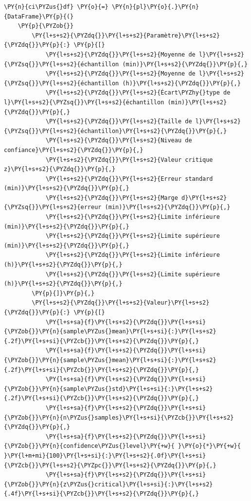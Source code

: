 \begin{tcolorbox}[breakable, size=fbox, boxrule=1pt, pad at break*=1mm,colback=cellbackground, colframe=cellborder]
\begin{Verbatim}[commandchars=\\\{\}]
\PY{n}{ci\PYZus{}df} \PY{o}{=} \PY{n}{pl}\PY{o}{.}\PY{n}{DataFrame}\PY{p}{(}
    \PY{p}{\PYZob{}}
        \PY{l+s+s2}{\PYZdq{}}\PY{l+s+s2}{Paramètre}\PY{l+s+s2}{\PYZdq{}}\PY{p}{:} \PY{p}{[}
            \PY{l+s+s2}{\PYZdq{}}\PY{l+s+s2}{Moyenne de l}\PY{l+s+s2}{\PYZsq{}}\PY{l+s+s2}{échantillon (min)}\PY{l+s+s2}{\PYZdq{}}\PY{p}{,}
            \PY{l+s+s2}{\PYZdq{}}\PY{l+s+s2}{Moyenne de l}\PY{l+s+s2}{\PYZsq{}}\PY{l+s+s2}{échantillon (h)}\PY{l+s+s2}{\PYZdq{}}\PY{p}{,}
            \PY{l+s+s2}{\PYZdq{}}\PY{l+s+s2}{Écart\PYZhy{}type de l}\PY{l+s+s2}{\PYZsq{}}\PY{l+s+s2}{échantillon (min)}\PY{l+s+s2}{\PYZdq{}}\PY{p}{,}
            \PY{l+s+s2}{\PYZdq{}}\PY{l+s+s2}{Taille de l}\PY{l+s+s2}{\PYZsq{}}\PY{l+s+s2}{échantillon}\PY{l+s+s2}{\PYZdq{}}\PY{p}{,}
            \PY{l+s+s2}{\PYZdq{}}\PY{l+s+s2}{Niveau de confiance}\PY{l+s+s2}{\PYZdq{}}\PY{p}{,}
            \PY{l+s+s2}{\PYZdq{}}\PY{l+s+s2}{Valeur critique z}\PY{l+s+s2}{\PYZdq{}}\PY{p}{,}
            \PY{l+s+s2}{\PYZdq{}}\PY{l+s+s2}{Erreur standard (min)}\PY{l+s+s2}{\PYZdq{}}\PY{p}{,}
            \PY{l+s+s2}{\PYZdq{}}\PY{l+s+s2}{Marge d}\PY{l+s+s2}{\PYZsq{}}\PY{l+s+s2}{erreur (min)}\PY{l+s+s2}{\PYZdq{}}\PY{p}{,}
            \PY{l+s+s2}{\PYZdq{}}\PY{l+s+s2}{Limite inférieure (min)}\PY{l+s+s2}{\PYZdq{}}\PY{p}{,}
            \PY{l+s+s2}{\PYZdq{}}\PY{l+s+s2}{Limite supérieure (min)}\PY{l+s+s2}{\PYZdq{}}\PY{p}{,}
            \PY{l+s+s2}{\PYZdq{}}\PY{l+s+s2}{Limite inférieure (h)}\PY{l+s+s2}{\PYZdq{}}\PY{p}{,}
            \PY{l+s+s2}{\PYZdq{}}\PY{l+s+s2}{Limite supérieure (h)}\PY{l+s+s2}{\PYZdq{}}\PY{p}{,}
        \PY{p}{]}\PY{p}{,}
        \PY{l+s+s2}{\PYZdq{}}\PY{l+s+s2}{Valeur}\PY{l+s+s2}{\PYZdq{}}\PY{p}{:} \PY{p}{[}
            \PY{l+s+sa}{f}\PY{l+s+s2}{\PYZdq{}}\PY{l+s+si}{\PYZob{}}\PY{n}{sample\PYZus{}mean}\PY{l+s+si}{:}\PY{l+s+s2}{.2f}\PY{l+s+si}{\PYZcb{}}\PY{l+s+s2}{\PYZdq{}}\PY{p}{,}
            \PY{l+s+sa}{f}\PY{l+s+s2}{\PYZdq{}}\PY{l+s+si}{\PYZob{}}\PY{n}{sample\PYZus{}mean}\PY{l+s+si}{:}\PY{l+s+s2}{.2f}\PY{l+s+si}{\PYZcb{}}\PY{l+s+s2}{\PYZdq{}}\PY{p}{,}
            \PY{l+s+sa}{f}\PY{l+s+s2}{\PYZdq{}}\PY{l+s+si}{\PYZob{}}\PY{n}{sample\PYZus{}std}\PY{l+s+si}{:}\PY{l+s+s2}{.2f}\PY{l+s+si}{\PYZcb{}}\PY{l+s+s2}{\PYZdq{}}\PY{p}{,}
            \PY{l+s+sa}{f}\PY{l+s+s2}{\PYZdq{}}\PY{l+s+si}{\PYZob{}}\PY{n}{n\PYZus{}samples}\PY{l+s+si}{\PYZcb{}}\PY{l+s+s2}{\PYZdq{}}\PY{p}{,}
            \PY{l+s+sa}{f}\PY{l+s+s2}{\PYZdq{}}\PY{l+s+si}{\PYZob{}}\PY{n}{confidence\PYZus{}level}\PY{+w}{ }\PY{o}{*}\PY{+w}{ }\PY{l+m+mi}{100}\PY{l+s+si}{:}\PY{l+s+s2}{.0f}\PY{l+s+si}{\PYZcb{}}\PY{l+s+s2}{\PYZpc{}}\PY{l+s+s2}{\PYZdq{}}\PY{p}{,}
            \PY{l+s+sa}{f}\PY{l+s+s2}{\PYZdq{}}\PY{l+s+si}{\PYZob{}}\PY{n}{z\PYZus{}critical}\PY{l+s+si}{:}\PY{l+s+s2}{.4f}\PY{l+s+si}{\PYZcb{}}\PY{l+s+s2}{\PYZdq{}}\PY{p}{,}

\end{Verbatim}
\end{tcolorbox}

